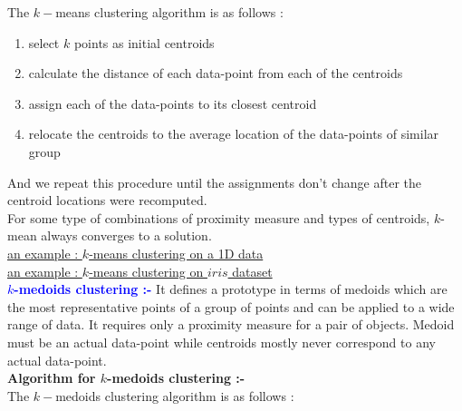 \documentclass[11pt, a4paper]{article}
\begin{document}
The $k-$means clustering algorithm is as follows :

\begin{enumerate}[(1)]
\item select $k$ points as initial centroids
\item calculate the distance of each data-point from each of the centroids
\item assign each of the data-points to its closest centroid
\item relocate the centroids to the average location of the data-points of similar group
\end{enumerate}

And we repeat this procedure until the assignments don't change after the centroid locations were recomputed. \\

For some type of combinations of proximity measure and types of centroids, $k$-mean always converges to a solution. \\

 \hspace{0.5cm} \href{https://github.com/sakunisgithub/R-programming/blob/master/msc_sem_2_practicals/rakesh_sir_practicals/practical_01/practical_01.pdf}{an example : $k$-means clustering on a 1D data} \\

 \hspace{0.5cm} \href{https://github.com/sakunisgithub/R-programming/blob/master/msc_sem_2_practicals/rakesh_sir_practicals/practical_02/practical_02.pdf}{an example : $k$-means clustering on $iris$ dataset} \\

\leftpointright \hspace{0.2cm} \textbf{\textcolor{blue}{$k$-medoids clustering :-}} It defines a prototype in terms of medoids which are the most representative points of a group of points and can be applied to a wide range of data. It requires only a proximity measure for a pair of objects. Medoid must be an actual data-point while centroids mostly never correspond to any actual data-point. \\

\faArrowAltCircleRight[regular] \hspace{0.2cm} \textbf{Algorithm for $k$-medoids clustering :-} \\

The $k-$medoids clustering algorithm is as follows :
\end{document}

